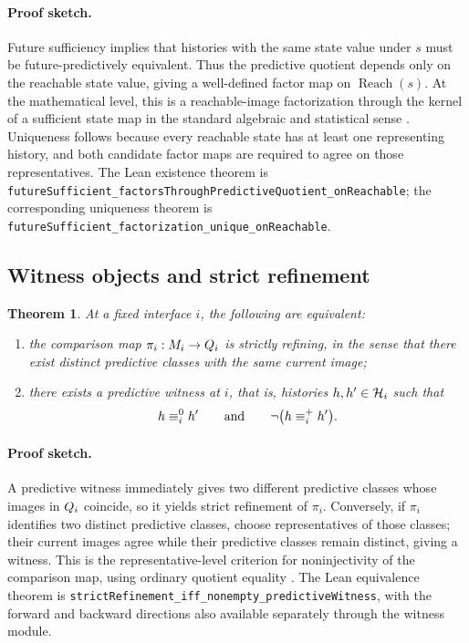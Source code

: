 \documentclass[11pt]{article}
\newtheorem{theorem}{Theorem}[section]
\theoremstyle{definition}
\begin{document}
\paragraph{Proof sketch.}
Future sufficiency implies that histories with the same state value under $s$ must be future-predictively equivalent. Thus the predictive quotient depends only on the reachable state value, giving a well-defined factor map on $\operatorname{Reach}(s)$. At the mathematical level, this is a reachable-image factorization through the kernel of a sufficient state map in the standard algebraic and statistical sense \citep{BurrisSankappanavar1981CourseUniversalAlgebra,LehmannCasella1998TheoryPointEstimation}. Uniqueness follows because every reachable state has at least one representing history, and both candidate factor maps are required to agree on those representatives. The Lean existence theorem is \nolinkurl{futureSufficient_factorsThroughPredictiveQuotient_onReachable}; the corresponding uniqueness theorem is \nolinkurl{futureSufficient_factorization_unique_onReachable}.

\subsection{Witness objects and strict refinement}\label{subsec:thm-witnesses}
\begin{theorem}\label{thm:witness-strict-refinement}
At a fixed interface $i$, the following are equivalent:
\begin{enumerate}
\item the comparison map $\pi_i : M_i \to Q_i$ is strictly refining, in the sense that there exist distinct predictive classes with the same current image;
\item there exists a predictive witness at $i$, that is, histories $h,h'\in\mathcal{H}_i$ such that
\[
h \equiv^{0}_i h'
\qquad\text{and}\qquad
\neg\bigl(h \equiv^{+}_i h'\bigr).
\]
\end{enumerate}
\end{theorem}

\paragraph{Proof sketch.}
A predictive witness immediately gives two different predictive classes whose images in $Q_i$ coincide, so it yields strict refinement of $\pi_i$. Conversely, if $\pi_i$ identifies two distinct predictive classes, choose representatives of those classes; their current images agree while their predictive classes remain distinct, giving a witness. This is the representative-level criterion for noninjectivity of the comparison map, using ordinary quotient equality \citep{MacLaneBirkhoff1999Algebra}. The Lean equivalence theorem is \nolinkurl{strictRefinement_iff_nonempty_predictiveWitness}, with the forward and backward directions also available separately through the witness module.
\end{document}
